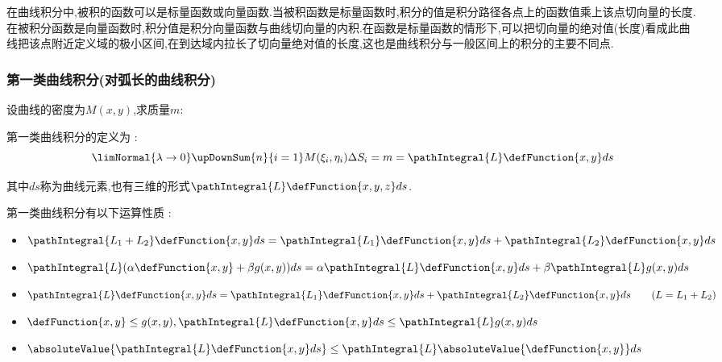 {{  在曲线积分中,被积的函数可以是标量函数或向量函数.当被积函数是标量函数时,积分的值是积分路径各点上的函数值乘上该点切向量的长度.在被积分函数是向量函数时,积分值是积分向量函数与曲线切向量的内积.在函数是标量函数的情形下,可以把切向量的绝对值(长度)看成此曲线把该点附近定义域的极小区间,在到达域内拉长了切向量绝对值的长度,这也是曲线积分与一般区间上的积分的主要不同点.

  \subsubsection{第一类曲线积分(对弧长的曲线积分)}{
    设曲线的密度为$M(x,y)$,求质量$m$:

    \begin{center}
    \end{center}

    第一类曲线积分的定义为 :
    $$
      \limNormal{\lambda \to 0}\upDownSum{n}{i = 1}M(\xi_i,\eta_i)\Delta S_i = m = \pathIntegral{L}\defFunction{x,y}ds
    $$

    其中$ds$称为曲线元素,也有三维的形式$\pathIntegral{L}\defFunction{x,y,z}ds$.

    第一类曲线积分有以下运算性质 :
    \begin{itemize}
      \item $\pathIntegral{L_1 + L_2}\defFunction{x,y}ds = \pathIntegral{L_1}\defFunction{x,y}ds + \pathIntegral{L_2}\defFunction{x,y}ds$
      \item $\pathIntegral{L}(\alpha\defFunction{x,y} + \beta g(x,y))ds = \alpha\pathIntegral{L}\defFunction{x,y}ds + \beta\pathIntegral{L}g(x,y)ds$
      \item $\pathIntegral{L}\defFunction{x,y}ds = \pathIntegral{L_1}\defFunction{x,y}ds + \pathIntegral{L_2}\defFunction{x,y}ds \qquad (L = L_1 + L_2)$
      \item $\defFunction{x,y} \leq g(x,y),\pathIntegral{L}\defFunction{x,y}ds \leq \pathIntegral{L}g(x,y)ds$
      \item $\absoluteValue{\pathIntegral{L}\defFunction{x,y}ds} \leq \pathIntegral{L}\absoluteValue{\defFunction{x,y}}ds$
    \end{itemize}
  }%

}}
